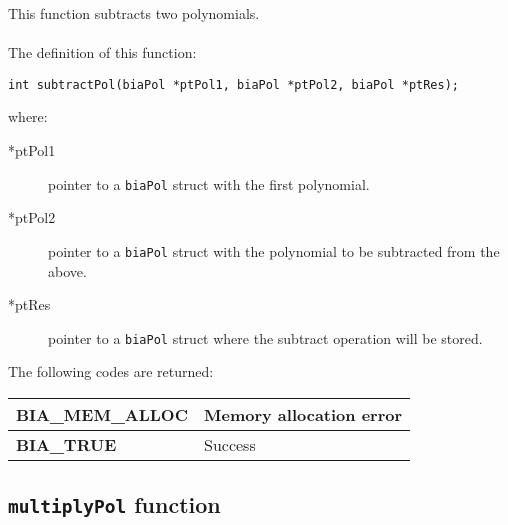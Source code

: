 This function subtracts two polynomials.\\ \\
%
The definition of this function:
%
\begin{verbatim}
int subtractPol(biaPol *ptPol1, biaPol *ptPol2, biaPol *ptRes);
\end{verbatim}
%
where:
%
\begin{description}
\item[*ptPol1] pointer to a \texttt{biaPol} struct with the first polynomial.
\item[*ptPol2] pointer to a \texttt{biaPol} struct with the polynomial to be subtracted from the above.
\item[*ptRes] pointer to a \texttt{biaPol} struct where the subtract operation will be stored.
\end{description}
%
The following codes are returned:
%
\begin{center}
\begin{tabular}{|l|l|}
\hline
\textbf{BIA\_MEM\_ALLOC} & Memory allocation error \\
\hline
\textbf{BIA\_TRUE} & Success \\
\hline
\end{tabular}
\end{center}
%
%

\subsection{\texttt{multiplyPol} function}

